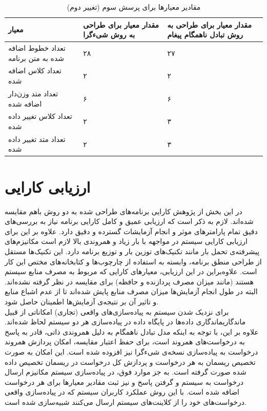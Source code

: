 \begin{enumerate}

\begin{table}
\begin{center}
\begin{tabular}{|p{7cm}|p{4cm}|p{4cm}|}
	\hline
\textbf{معیار} & \textbf{مقدار معیار برای طراحی به روش شیءگرا} & \textbf{مقدار معیار برای طراحی به روش تبادل ناهمگام پیغام} 
\\ 
	\hline
	تعداد خطوط اضافه شده به متن برنامه
	 &
	 ۲۸
	 &
	 ۲۷
\\
	\hline
	تعداد کلاس اضافه شده
	 &
	 ۲
	 &
	 ۲
\\
	\hline
	تعداد متد وزن‌دار اضافه شده
	 &
	 ۶
	 &
	 ۶
\\
	\hline

	تعداد کلاس تغییر داده شده
	 &
	۲
	 &
	 ۳
\\
	\hline

	تعداد متد تغییر داده شده
	 &
	۲
	 &
	 ۳
\\
	\hline

\end{tabular}
\caption{\label{table:mod_result_3_2} مقادیر معیارها برای پرسش سوم (تغییر دوم)}
\end{center}
\end{table}

\end{enumerate}




\section{ارزیابی کارایی}
در این بخش از پژوهش کارایی برنامه‌های طراحی‌ شده به دو روش باهم مقایسه شده‌اند. لازم به ذکر است که ارزیابی عمیق و کامل کارایی برنامه نیاز به بررسی‌های دقیق تمام پارامترهای موثر و انجام آزمایشات گسترده و دقیق دارد. علاوه بر این برای ارزیابی کارایی سیستم در مواجهه با بار زیاد و همروندی بالا لازم است مکانیزم‌های پیشرفته‌ی تحمل بار مانند تکنیک‌های \gls{توزین بار} و توزیع برنامه دارد. این تکنیک‌ها مستقل از طراحی منطق برنامه، وابسته به استفاده از چارچوب‌ها و کتابخانه‌های مختص این کار است. علاوه‌براین در این ارزیابی، معیارهای کارایی که مربوط به مصرف منابع سیستم هستند (مانند میزان مصرف پردازنده و حافظه) برای مقایسه در نظر گرفته نشده‌اند. البته در طول انجام آزمایش‌ها میزان مصرف منابع پایش شده‌اند تا از عدم اشباع منابع و تاثیر آن بر نتیجه‌ی آزمایش‌ها اطمینان حاصل شود.\\
برای نزدیک شدن سیستم به پیاده‌سازی‌های واقعی (تجاری) امکاناتی از قبیل ماندگاری\gls{ماندگاری} داده‌ها در پایگاه داده در پیاده‌سازی هر دو سیستم لحاظ شده‌اند. علاوه بر این، با توجه به اینکه مدل تبادل ناهمگام به دلیل همروندی ذاتی، قادر به پاسخ به درخواست‌های همروند است، برای حفظ اعتبار مقایسه، امکان پردازش همروند درخواست به پیاده‌سازی نسخه‌ی شیءگرا نیز افزوده شده است. این امکان به صورت تخصیص ریسمان به هر درخواست و پردازش کل درخواست در ریسمان تخصیص داده شده صورت گرفته است. به جز موارد فوق، در پیاده‌سازی سیستم مکانیزم ارسال درخواست به سیستم و گرفتن پاسخ و نیز ثبت مقادیر معیارها برای هر درخواست اضافه شده است. با این روش عملکرد کاربران سیستم که در پیاده‌سازی واقعی درخواست‌های خود را از کلاینت‌های سیستم ارسال می‌کنند شبیه‌سازی شده است.


